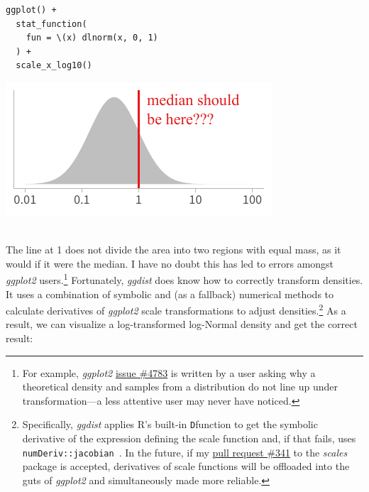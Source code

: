 \documentclass[journal]{vgtc}                     %
\providecommand{\DIFadd}[1]{{\protect\color{blue}\uwave{#1}}} %
\providecommand{\DIFaddbegin}{} %
\providecommand{\DIFaddend}{} %
\begin{document}
\noindent
\begin{minipage}{.5\columnwidth}
\small
\begin{verbatim}
ggplot() +
  stat_function(
    fun = \(x) dlnorm(x, 0, 1)
  ) +
  scale_x_log10()
\end{verbatim}
\end{minipage}%
  \begin{minipage}{.4\columnwidth}
    \centering
    \includegraphics[width=1.2\columnwidth]{figs/3-jacobian-incorrect.pdf}
  \end{minipage}
\vspace{.5\belowdisplayskip}\\
The line at 1 does not divide the area into two regions with equal mass, as it would if it were the median. I have no doubt this has led to errors amongst \textit{ggplot2} users.\footnote{For example, \textit{ggplot2} \href{https://github.com/tidyverse/ggplot2/issues/4783}{issue \#4783} is written by a user asking why a theoretical density and samples from a distribution do not line up under transformation---a less attentive user may never have noticed.} Fortunately, \textit{ggdist} does know how to correctly transform densities. It uses a combination of symbolic and (as a fallback) numerical methods to calculate derivatives of \textit{ggplot2} scale transformations to adjust densities.\footnote{Specifically, \textit{ggdist} applies R's built-in \texttt{D}\DIFaddbegin \DIFadd{~\mbox{%
\cite{r2022} }\hskip0pt%
}\DIFaddend function to get the symbolic derivative of the expression defining the scale function and, if that fails, uses \texttt{numDeriv::jacobian}~\cite{gilbert2016numderiv}. In the future, if my \href{https://github.com/r-lib/scales/pull/341}{pull request \#341} to the \textit{scales} package is accepted, derivatives of scale functions will be offloaded into the guts of \textit{ggplot2} and simultaneously made more reliable.} As a result, we can visualize a log-transformed log-Normal density and get the correct result:
\end{document}

